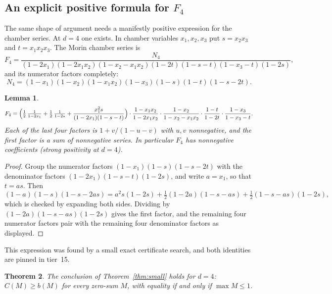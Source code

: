 \documentclass[11pt,a4paper]{article}
\theoremstyle{plain}
\newtheorem{theorem}{Theorem}
\newtheorem{lemma}[theorem]{Lemma}
\theoremstyle{definition}
\theoremstyle{remark}
\begin{document}
\subsection{An explicit positive formula for $F_4$}

The same shape of argument needs a manifestly positive expression for the chamber series. At
$d = 4$ one exists. In chamber variables $x_1, x_2, x_3$ put $s = x_2x_3$ and $t = x_1x_2x_3$. The
Morin chamber series is
\[
  F_4 = \frac{N_4}{(1-2x_1)(1-2x_1x_2)(1-x_2-x_1x_2)(1-2t)(1-s-t)(1-x_3-t)(1-2s)} ,
\]
and its numerator factors completely:
\[
  N_4 = (1-x_1)(1-x_2)(1-x_1x_2)(1-x_3)(1-s)(1-t)(1-s-2t).
\]

\begin{lemma}\label{lem:f4}
\[
  F_4 = \Bigl(\tfrac12\,\tfrac{1}{1-2x_1} + \tfrac12\,\tfrac{1}{1-2s}
          + \frac{x_1^2 s}{(1-2x_1)(1-s-t)}\Bigr)
        \cdot \frac{1-x_1x_2}{1-2x_1x_2}\cdot\frac{1-x_2}{1-x_2-x_1x_2}
        \cdot \frac{1-t}{1-2t}\cdot\frac{1-x_3}{1-x_3-t} .
\]
Each of the last four factors is $1 + v/(1-u-v)$ with $u, v$ nonnegative, and the first factor is
a sum of nonnegative series. In particular $F_4$ has nonnegative coefficients (strong positivity
at $d = 4$).
\end{lemma}

\begin{proof}
Group the numerator factors $(1-x_1)(1-s)(1-s-2t)$ with the denominator factors
$(1-2x_1)(1-s-t)(1-2s)$, and write $a = x_1$, so that $t = as$. Then
\[
  (1-a)(1-s)(1-s-2as) = a^2 s (1-2s) + \tfrac12 (1-2a)(1-s-as) + \tfrac12 (1-s-as)(1-2s),
\]
which is checked by expanding both sides. Dividing by $(1-2a)(1-s-as)(1-2s)$ gives the first
factor, and the remaining four numerator factors pair with the remaining four denominator
factors as displayed.
\end{proof}

This expression was found by a small exact certificate search, and both identities are pinned in
tier~15.

\begin{theorem}\label{thm:d4}
The conclusion of Theorem~\ref{thm:small} holds for $d = 4$: $C(M) \ge b(M)$ for every zero-sum
$M$, with equality if and only if $\max M \le 1$.
\end{theorem}
\end{document}
